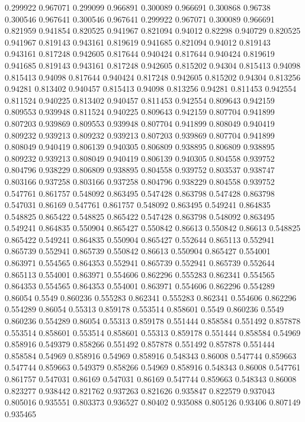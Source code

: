 0.299922 0.967071
0.299099 0.966891
0.300089 0.966691
0.300868 0.96738
0.300546 0.967641
0.300546 0.967641
0.299922 0.967071
0.300089 0.966691
0.821959 0.941854
0.820525 0.941967
0.821094 0.94012
0.82298 0.940729
0.820525 0.941967
0.819143 0.943161
0.819619 0.941685
0.821094 0.94012
0.819143 0.943161
0.817248 0.942605
0.817644 0.940424
0.817644 0.940424
0.819619 0.941685
0.819143 0.943161
0.817248 0.942605
0.815202 0.94304
0.815413 0.94098
0.815413 0.94098
0.817644 0.940424
0.817248 0.942605
0.815202 0.94304
0.813256 0.94281
0.813402 0.940457
0.815413 0.94098
0.813256 0.94281
0.811453 0.942554
0.811524 0.940225
0.813402 0.940457
0.811453 0.942554
0.809643 0.942159
0.809553 0.939948
0.811524 0.940225
0.809643 0.942159
0.807704 0.941899
0.807203 0.939869
0.809553 0.939948
0.807704 0.941899
0.808049 0.940419
0.809232 0.939213
0.809232 0.939213
0.807203 0.939869
0.807704 0.941899
0.808049 0.940419
0.806139 0.940305
0.806809 0.938895
0.806809 0.938895
0.809232 0.939213
0.808049 0.940419
0.806139 0.940305
0.804558 0.939752
0.804796 0.938229
0.806809 0.938895
0.804558 0.939752
0.803537 0.938747
0.803166 0.937258
0.803166 0.937258
0.804796 0.938229
0.804558 0.939752
0.547761 0.861757
0.548092 0.863495
0.547428 0.863798
0.547428 0.863798
0.547031 0.86169
0.547761 0.861757
0.548092 0.863495
0.549241 0.864835
0.548825 0.865422
0.548825 0.865422
0.547428 0.863798
0.548092 0.863495
0.549241 0.864835
0.550904 0.865427
0.550842 0.86613
0.550842 0.86613
0.548825 0.865422
0.549241 0.864835
0.550904 0.865427
0.552644 0.865113
0.552941 0.865739
0.552941 0.865739
0.550842 0.86613
0.550904 0.865427
0.554001 0.863971
0.554565 0.864353
0.552941 0.865739
0.552941 0.865739
0.552644 0.865113
0.554001 0.863971
0.554606 0.862296
0.555283 0.862341
0.554565 0.864353
0.554565 0.864353
0.554001 0.863971
0.554606 0.862296
0.554289 0.86054
0.5549 0.860236
0.555283 0.862341
0.555283 0.862341
0.554606 0.862296
0.554289 0.86054
0.55313 0.859178
0.553514 0.858601
0.5549 0.860236
0.5549 0.860236
0.554289 0.86054
0.55313 0.859178
0.551444 0.858584
0.551492 0.857878
0.553514 0.858601
0.553514 0.858601
0.55313 0.859178
0.551444 0.858584
0.54969 0.858916
0.549379 0.858266
0.551492 0.857878
0.551492 0.857878
0.551444 0.858584
0.54969 0.858916
0.54969 0.858916
0.548343 0.86008
0.547744 0.859663
0.547744 0.859663
0.549379 0.858266
0.54969 0.858916
0.548343 0.86008
0.547761 0.861757
0.547031 0.86169
0.547031 0.86169
0.547744 0.859663
0.548343 0.86008
0.823277 0.938442
0.821762 0.937263
0.821626 0.935847
0.822579 0.937043
0.805016 0.935551
0.803373 0.936527
0.80402 0.935088
0.805126 0.93406
0.807149 0.935465
